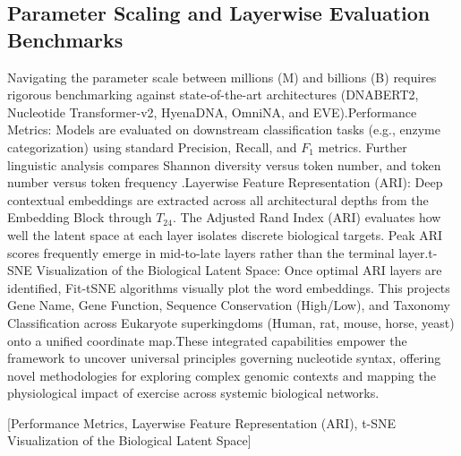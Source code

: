 \documentclass[11pt]{article}
\begin{document}
\subsection{Parameter Scaling and Layerwise Evaluation Benchmarks}
Navigating the parameter scale between millions (M) and billions (B) requires rigorous benchmarking against state-of-the-art architectures (DNABERT2, Nucleotide Transformer-v2, HyenaDNA, OmniNA, and EVE).Performance Metrics: Models are evaluated on downstream classification tasks (e.g., enzyme categorization) using standard Precision, Recall, and $F_1$ metrics. Further linguistic analysis compares Shannon diversity versus token number, and token number versus token frequency .Layerwise Feature Representation (ARI): Deep contextual embeddings are extracted across all architectural depths from the Embedding Block through $T_{24}$. The Adjusted Rand Index (ARI) evaluates how well the latent space at each layer isolates discrete biological targets. Peak ARI scores frequently emerge in mid-to-late layers rather than the terminal layer.t-SNE Visualization of the Biological Latent Space: Once optimal ARI layers are identified, Fit-tSNE algorithms visually plot the word embeddings. This projects Gene Name, Gene Function, Sequence Conservation (High/Low), and Taxonomy Classification across Eukaryote superkingdoms (Human, rat, mouse, horse, yeast) onto a unified coordinate map.These integrated capabilities empower the framework to uncover universal principles governing nucleotide syntax, offering novel methodologies for exploring complex genomic contexts and mapping the physiological impact of exercise across systemic biological networks.

[Performance Metrics, Layerwise Feature Representation (ARI), t-SNE Visualization of the Biological Latent Space]
\end{document}
